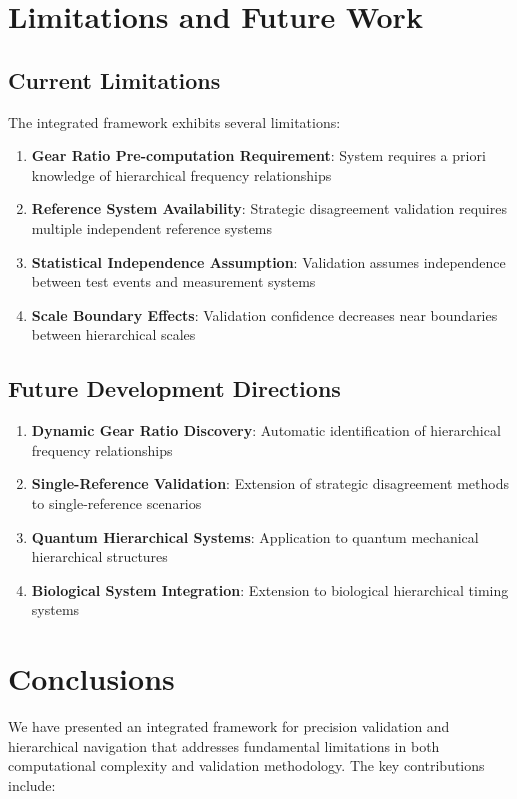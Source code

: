 \documentclass[12pt,a4paper]{article}
\begin{document}
\section{Limitations and Future Work}

\subsection{Current Limitations}

The integrated framework exhibits several limitations:

\begin{enumerate}
\item \textbf{Gear Ratio Pre-computation Requirement}: System requires a priori knowledge of hierarchical frequency relationships
\item \textbf{Reference System Availability}: Strategic disagreement validation requires multiple independent reference systems
\item \textbf{Statistical Independence Assumption}: Validation assumes independence between test events and measurement systems
\item \textbf{Scale Boundary Effects}: Validation confidence decreases near boundaries between hierarchical scales
\end{enumerate}

\subsection{Future Development Directions}

\begin{enumerate}
\item \textbf{Dynamic Gear Ratio Discovery}: Automatic identification of hierarchical frequency relationships
\item \textbf{Single-Reference Validation}: Extension of strategic disagreement methods to single-reference scenarios
\item \textbf{Quantum Hierarchical Systems}: Application to quantum mechanical hierarchical structures
\item \textbf{Biological System Integration}: Extension to biological hierarchical timing systems
\end{enumerate}

\section{Conclusions}

We have presented an integrated framework for precision validation and hierarchical navigation that addresses fundamental limitations in both computational complexity and validation methodology. The key contributions include:
\end{document}
